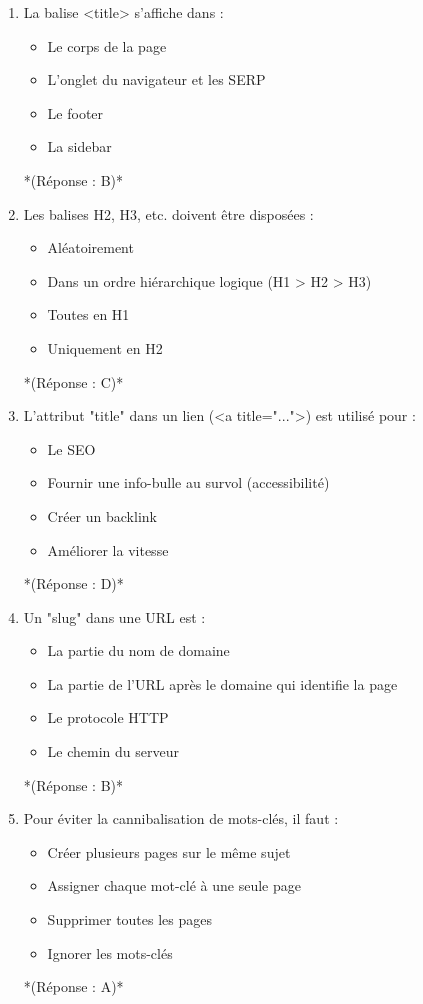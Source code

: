 \documentclass[12pt,a4paper,twoside]{report}
\begin{document}
\begin{enumerate}
\item La balise <title> s'affiche dans :
\begin{itemize}
\item[A)] Le corps de la page
\item[B)] L'onglet du navigateur et les SERP
\item[C)] Le footer
\item[D)] La sidebar
\end{itemize}
*(Réponse : B)*

\item Les balises H2, H3, etc. doivent être disposées :
\begin{itemize}
\item[A)] Aléatoirement
\item[B)] Dans un ordre hiérarchique logique (H1 > H2 > H3)
\item[C)] Toutes en H1
\item[D)] Uniquement en H2
\end{itemize}
*(Réponse : C)*

\item L'attribut "title" dans un lien (<a title="...">) est utilisé pour :
\begin{itemize}
\item[A)] Le SEO
\item[B)] Fournir une info-bulle au survol (accessibilité)
\item[C)] Créer un backlink
\item[D)] Améliorer la vitesse
\end{itemize}
*(Réponse : D)*

\item Un "slug" dans une URL est :
\begin{itemize}
\item[A)] La partie du nom de domaine
\item[B)] La partie de l'URL après le domaine qui identifie la page
\item[C)] Le protocole HTTP
\item[D)] Le chemin du serveur
\end{itemize}
*(Réponse : B)*

\item Pour éviter la cannibalisation de mots-clés, il faut :
\begin{itemize}
\item[A)] Créer plusieurs pages sur le même sujet
\item[B)] Assigner chaque mot-clé à une seule page
\item[C)] Supprimer toutes les pages
\item[D)] Ignorer les mots-clés
\end{itemize}
*(Réponse : A)*
\end{enumerate}
\end{document}

